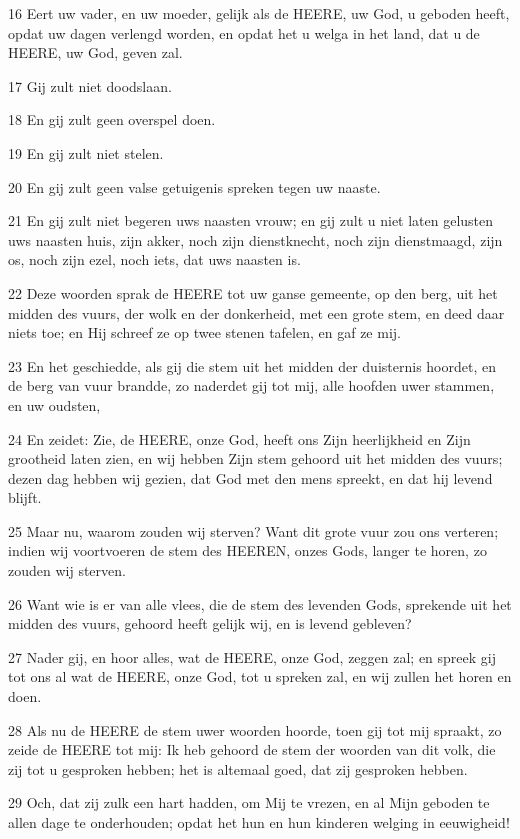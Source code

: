 \par 16 Eert uw vader, en uw moeder, gelijk als de HEERE, uw God, u geboden heeft, opdat uw dagen verlengd worden, en opdat het u welga in het land, dat u de HEERE, uw God, geven zal.
\par 17 Gij zult niet doodslaan.
\par 18 En gij zult geen overspel doen.
\par 19 En gij zult niet stelen.
\par 20 En gij zult geen valse getuigenis spreken tegen uw naaste.
\par 21 En gij zult niet begeren uws naasten vrouw; en gij zult u niet laten gelusten uws naasten huis, zijn akker, noch zijn dienstknecht, noch zijn dienstmaagd, zijn os, noch zijn ezel, noch iets, dat uws naasten is.
\par 22 Deze woorden sprak de HEERE tot uw ganse gemeente, op den berg, uit het midden des vuurs, der wolk en der donkerheid, met een grote stem, en deed daar niets toe; en Hij schreef ze op twee stenen tafelen, en gaf ze mij.
\par 23 En het geschiedde, als gij die stem uit het midden der duisternis hoordet, en de berg van vuur brandde, zo naderdet gij tot mij, alle hoofden uwer stammen, en uw oudsten,
\par 24 En zeidet: Zie, de HEERE, onze God, heeft ons Zijn heerlijkheid en Zijn grootheid laten zien, en wij hebben Zijn stem gehoord uit het midden des vuurs; dezen dag hebben wij gezien, dat God met den mens spreekt, en dat hij levend blijft.
\par 25 Maar nu, waarom zouden wij sterven? Want dit grote vuur zou ons verteren; indien wij voortvoeren de stem des HEEREN, onzes Gods, langer te horen, zo zouden wij sterven.
\par 26 Want wie is er van alle vlees, die de stem des levenden Gods, sprekende uit het midden des vuurs, gehoord heeft gelijk wij, en is levend gebleven?
\par 27 Nader gij, en hoor alles, wat de HEERE, onze God, zeggen zal; en spreek gij tot ons al wat de HEERE, onze God, tot u spreken zal, en wij zullen het horen en doen.
\par 28 Als nu de HEERE de stem uwer woorden hoorde, toen gij tot mij spraakt, zo zeide de HEERE tot mij: Ik heb gehoord de stem der woorden van dit volk, die zij tot u gesproken hebben; het is altemaal goed, dat zij gesproken hebben.
\par 29 Och, dat zij zulk een hart hadden, om Mij te vrezen, en al Mijn geboden te allen dage te onderhouden; opdat het hun en hun kinderen welging in eeuwigheid!

